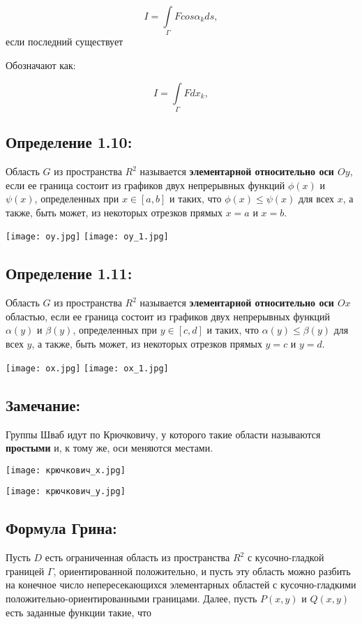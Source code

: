 \documentclass[12pt]{article}
\begin{document}
	$$I = \int\limits_{\Gamma}{} F  cos \alpha_k d{s},$$
	если последний существует
	
	Обозначают как:
	
		$$I = \int\limits_{\Gamma}{} F d{x_k},$$
	\newpage
\subsection*{Определение 1.10:}
	Область $G$ из пространства $R^2$ называется \textbf{элементарной относительно оси $Oy$}, если ее граница состоит из графиков двух непрерывных функций $\phi(x)$ и $\psi(x)$, определенных при
$x \in [a, b]$ и таких, что $\phi(x)	\leq \psi(x)$ для всех $x$, а также, быть
может, из некоторых отрезков прямых $x = a$ и $x = b$.


\texttt{[image: oy.jpg]}
\texttt{[image: oy\_1.jpg]}

\subsection*{Определение 1.11:}
	Область $G$ из пространства $R^2$ называется \textbf{элементарной относительно оси $Ox$} областью, если ее граница состоит из графиков двух непрерывных функций $\alpha(y)$ и $\beta(y)$, определенных при
$y \in [c, d]$ и таких, что $\alpha(y)	\leq \beta(y)$ для всех $y$, а также, быть
может, из некоторых отрезков прямых $y = c$ и $y = d$.


\texttt{[image: ox.jpg]}
\texttt{[image: ox\_1.jpg]}
\newpage
\subsection*{Замечание:}
	Группы Шваб идут по Крючковичу, у которого такие области называются \textbf{простыми} и, к тому же, оси меняются местами.
	
	
\texttt{[image: крючкович\_x.jpg]}

\texttt{[image: крючкович\_y.jpg]}
\newpage
\subsection{Формула Грина:}
	Пусть $D$ есть ограниченная область из пространства $R^2$
с кусочно-гладкой границей $\Gamma$, ориентированной положительно, и пусть
эту область можно разбить на конечное число непересекающихся элементарных областей с кусочно-гладкими положительно-ориентированными границами. Далее, пусть $P(x, y)$ и $Q(x, y)$ есть заданные функции
такие, что 
\end{document}
